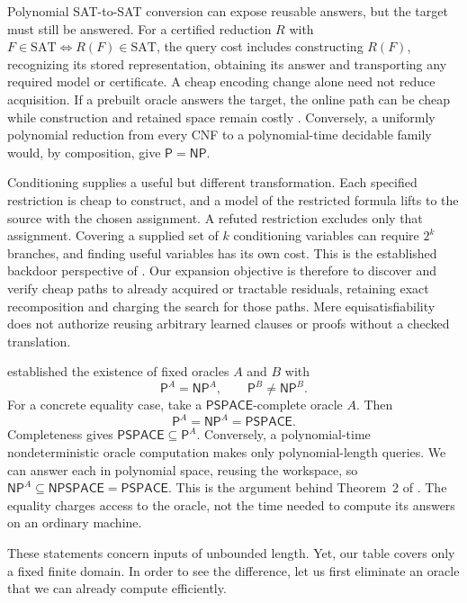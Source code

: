 \documentclass[11pt,a4paper]{article}
\numberwithin{equation}{section}
\newcommand{\Pclass}{\mathsf{P}}
\newcommand{\NPclass}{\mathsf{NP}}
\newcommand{\SAT}{\mathrm{SAT}}
\theoremstyle{plain}
\theoremstyle{definition}
\theoremstyle{remark}
\begin{document}
Polynomial SAT-to-SAT conversion can expose reusable answers, but the target
must still be answered. For a certified reduction $R$ with
$F\in\SAT\iff R(F)\in\SAT$, the query cost includes constructing $R(F)$,
recognizing its stored representation, obtaining its answer and transporting
any required model or certificate. A cheap encoding change alone need not
reduce acquisition. If a prebuilt oracle answers the target, the online path
can be cheap while construction and retained space remain costly
\citep{darwiche2002}. Conversely, a uniformly polynomial reduction from every
CNF to a polynomial-time decidable family would, by composition, give
$\Pclass=\NPclass$.

Conditioning supplies a useful but different transformation. Each specified
restriction is cheap to construct, and a model of the restricted formula lifts
to the source with the chosen assignment. A refuted restriction excludes only
that assignment. Covering a supplied set of $k$ conditioning variables can
require $2^k$ branches, and finding useful variables has its own cost. This is
the established backdoor perspective of \citet{williams2003backdoors}.
Our expansion objective is therefore to discover and verify cheap paths to
already acquired or tractable residuals, retaining exact recomposition and
charging the search for those paths. Mere equisatisfiability does not authorize
reusing arbitrary learned clauses or proofs without a checked translation.

\citet{baker1975} established the existence of fixed oracles $A$ and $B$ with
\begin{equation}
\Pclass^A=\NPclass^A,\qquad
\Pclass^B\neq\NPclass^B.
\end{equation}
For a concrete equality case, take a $\mathsf{PSPACE}$-complete oracle $A$. Then
\begin{equation}
\Pclass^A=\NPclass^A=\mathsf{PSPACE}.
\end{equation}
Completeness gives $\mathsf{PSPACE}\subseteq\Pclass^A$. Conversely, a polynomial-time nondeterministic oracle computation makes only polynomial-length queries. We can answer each in polynomial space, reusing the workspace, so $\NPclass^A\subseteq\mathsf{NPSPACE}=\mathsf{PSPACE}$. This is the argument behind Theorem~2 of \citet{baker1975}. The equality charges access to the oracle, not the time needed to compute its answers on an ordinary machine.

These statements concern inputs of unbounded length. Yet, our table covers only a fixed finite domain. In order to see the difference, let us first eliminate an oracle that we can already compute efficiently.
\end{document}
